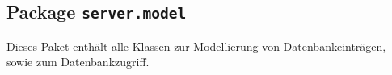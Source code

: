  \FloatBarrier
 \subsection[Package server.model]{Package \texttt{server.model}}
 Dieses Paket enthält alle Klassen zur Modellierung von Datenbankeinträgen, sowie zum Datenbankzugriff.



